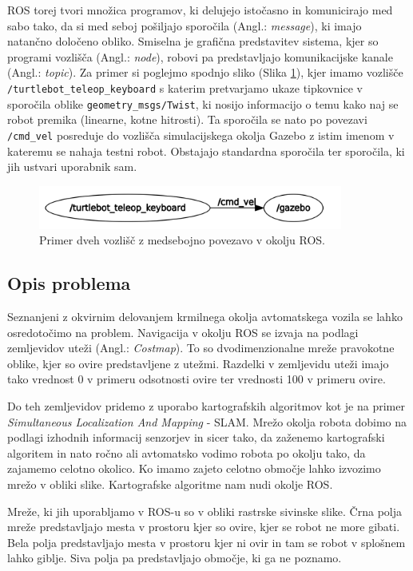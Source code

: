 \documentclass[10pt,a4paper]{article}
\begin{document}
ROS torej tvori množica programov, ki delujejo istočasno in komunicirajo med sabo tako, da si med seboj pošiljajo sporočila (Angl.: \textit{message}), ki imajo natančno določeno obliko. Smiselna je grafična predstavitev sistema, kjer so programi vozlišča (Angl.: \textit{node}), robovi pa predstavljajo komunikacijske kanale (Angl.: \textit{topic}). Za primer si poglejmo spodnjo sliko (Slika \ref{fig:sl1}), kjer imamo vozlišče \texttt{/turtlebot\_teleop\_keyboard} s katerim pretvarjamo ukaze tipkovnice v sporočila oblike \texttt{geometry\_msgs/Twist}, ki nosijo informacijo o temu kako naj se robot premika (linearne, kotne hitrosti). Ta sporočila se nato po povezavi \texttt{/cmd\_vel} posreduje do vozlišča simulacijskega okolja Gazebo z istim imenom v kateremu se nahaja testni robot. Obstajajo standardna sporočila ter sporočila, ki jih ustvari uporabnik sam.

\begin{figure}[H]
	\centering
	\includegraphics[width=10cm]{pic/ros.png}
	\caption{Primer dveh vozlišč z medsebojno povezavo v okolju ROS.}
	\label{fig:sl1}
\end{figure}

\subsection{Opis problema}

Seznanjeni z okvirnim delovanjem krmilnega okolja avtomatskega vozila se lahko osredotočimo na problem. Navigacija v okolju ROS se izvaja na podlagi zemljevidov uteži (Angl.: \textit{Costmap}). To so dvodimenzionalne mreže pravokotne oblike, kjer so ovire predstavljene z utežmi. Razdelki v zemljevidu uteži imajo tako vrednost 0 v primeru odsotnosti ovire ter vrednosti 100 v primeru ovire.

Do teh zemljevidov pridemo z uporabo kartografskih algoritmov kot je na primer \textit{Simultaneous Localization And Mapping} - SLAM. Mrežo okolja robota dobimo na podlagi izhodnih informacij senzorjev in sicer tako, da zaženemo kartografski algoritem in nato ročno ali avtomatsko vodimo robota po okolju tako, da zajamemo celotno okolico. Ko imamo zajeto celotno območje lahko izvozimo mrežo v obliki slike. Kartografske algoritme nam nudi okolje ROS. 

Mreže, ki jih uporabljamo v ROS-u so v obliki rastrske sivinske slike. Črna polja mreže predstavljajo mesta v prostoru kjer so ovire, kjer se robot ne more gibati. Bela polja predstavljajo mesta v prostoru kjer ni ovir in tam se robot v splošnem lahko giblje. Siva polja pa predstavljajo območje, ki ga ne poznamo.
\end{document}

